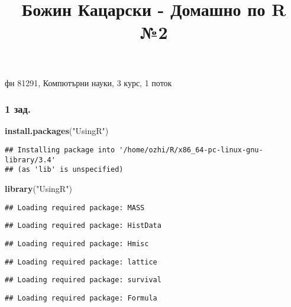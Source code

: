 \documentclass[]{article}
\title{Божин Кацарски - Домашно по R №2}
\author{}
\date{}
\newenvironment{Shaded}{\begin{snugshade}}{\end{snugshade}}
\newcommand{\KeywordTok}[1]{\textcolor[rgb]{0.13,0.29,0.53}{\textbf{#1}}}
\newcommand{\StringTok}[1]{\textcolor[rgb]{0.31,0.60,0.02}{#1}}
\newcommand{\NormalTok}[1]{#1}
\begin{document}
\maketitle

фн 81291, Компютърни науки, 3 курс, 1 поток

\subsubsection{1 зад.}\label{.}

\begin{Shaded}
\begin{Highlighting}[]
\KeywordTok{install.packages}\NormalTok{(}\StringTok{"UsingR"}\NormalTok{)}
\end{Highlighting}
\end{Shaded}

\begin{verbatim}
## Installing package into '/home/ozhi/R/x86_64-pc-linux-gnu-library/3.4'
## (as 'lib' is unspecified)
\end{verbatim}

\begin{Shaded}
\begin{Highlighting}[]
\KeywordTok{library}\NormalTok{(}\StringTok{"UsingR"}\NormalTok{)}
\end{Highlighting}
\end{Shaded}

\begin{verbatim}
## Loading required package: MASS
\end{verbatim}

\begin{verbatim}
## Loading required package: HistData
\end{verbatim}

\begin{verbatim}
## Loading required package: Hmisc
\end{verbatim}

\begin{verbatim}
## Loading required package: lattice
\end{verbatim}

\begin{verbatim}
## Loading required package: survival
\end{verbatim}

\begin{verbatim}
## Loading required package: Formula
\end{verbatim}
\end{document}
